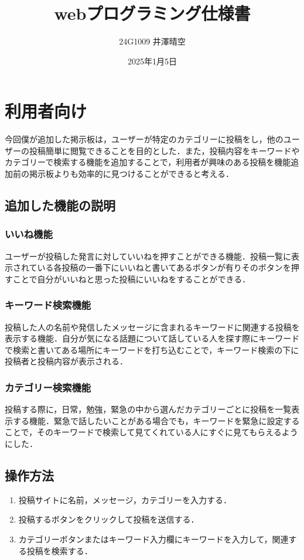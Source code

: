 \documentclass[uplatex,dvipdfmx]{jsarticle}
\begin{document}
\title{webプログラミング仕様書}
\author{24G1009 井澤晴空}
\date{2025年1月5日}
\maketitle
\section{利用者向け}
今回僕が追加した掲示板は，ユーザーが特定のカテゴリーに投稿をし，他のユーザーの投稿簡単に閲覧できることを目的とした．また，投稿内容をキーワードやカテゴリーで検索する機能を追加することで，利用者が興味のある投稿を機能追加前の掲示板よりも効率的に見つけることができると考える．


\subsection{追加した機能の説明}

\subsubsection{いいね機能} 
ユーザーが投稿した発言に対していいねを押すことができる機能．投稿一覧に表示されている各投稿の一番下にいいねと書いてあるボタンが有りそのボタンを押すことで自分がいいねと思った投稿にいいねをすることができる．

\subsubsection{キーワード検索機能}
投稿した人の名前や発信したメッセージに含まれるキーワードに関連する投稿を表示する機能．自分が気になる話題について話している人を探す際にキーワードで検索と書いてある場所にキーワードを打ち込むことで，キーワード検索の下に投稿者と投稿内容が表示される．
\subsubsection{カテゴリー検索機能}
投稿する際に，日常，勉強，緊急の中から選んだカテゴリーごとに投稿を一覧表示する機能．緊急で話したいことがある場合でも，キーワードを緊急に設定することで，そのキーワードで検索して見てくれている人にすぐに見てもらえるようにした．

\subsection{操作方法}
\begin{enumerate}
\item 投稿サイトに名前，メッセージ，カテゴリーを入力する．
\item 投稿するボタンをクリックして投稿を送信する．
\item カテゴリーボタンまたはキーワード入力欄にキーワードを入力して，関連する投稿を検索する．
\end{enumerate}
\end{document}
